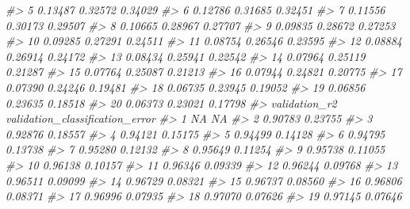 \documentclass[]{book}
\newenvironment{Shaded}{\begin{snugshade}}{\end{snugshade}}
\newcommand{\CommentTok}[1]{\textcolor[rgb]{0.56,0.35,0.01}{\textit{#1}}}
\begin{document}
\begin{Shaded}
\begin{Highlighting}[]
{{{{\CommentTok{#> 5                        0.13487         0.32572            0.34029}
\CommentTok{#> 6                        0.12786         0.31685            0.32451}
\CommentTok{#> 7                        0.11556         0.30173            0.29507}
\CommentTok{#> 8                        0.10665         0.28967            0.27707}
\CommentTok{#> 9                        0.09835         0.28672            0.27253}
\CommentTok{#> 10                       0.09285         0.27291            0.24511}
\CommentTok{#> 11                       0.08754         0.26546            0.23595}
\CommentTok{#> 12                       0.08884         0.26914            0.24172}
\CommentTok{#> 13                       0.08434         0.25941            0.22542}
\CommentTok{#> 14                       0.07964         0.25119            0.21287}
\CommentTok{#> 15                       0.07764         0.25087            0.21213}
\CommentTok{#> 16                       0.07944         0.24821            0.20775}
\CommentTok{#> 17                       0.07390         0.24246            0.19481}
\CommentTok{#> 18                       0.06735         0.23945            0.19052}
\CommentTok{#> 19                       0.06856         0.23635            0.18518}
\CommentTok{#> 20                       0.06373         0.23021            0.17798}
\CommentTok{#>    validation_r2 validation_classification_error}
\CommentTok{#> 1             NA                              NA}
\CommentTok{#> 2        0.90783                         0.23755}
\CommentTok{#> 3        0.92876                         0.18557}
\CommentTok{#> 4        0.94121                         0.15175}
\CommentTok{#> 5        0.94499                         0.14128}
\CommentTok{#> 6        0.94795                         0.13738}
\CommentTok{#> 7        0.95280                         0.12132}
\CommentTok{#> 8        0.95649                         0.11254}
\CommentTok{#> 9        0.95738                         0.11055}
\CommentTok{#> 10       0.96138                         0.10157}
\CommentTok{#> 11       0.96346                         0.09339}
\CommentTok{#> 12       0.96244                         0.09768}
\CommentTok{#> 13       0.96511                         0.09099}
\CommentTok{#> 14       0.96729                         0.08321}
\CommentTok{#> 15       0.96737                         0.08560}
\CommentTok{#> 16       0.96806                         0.08371}
\CommentTok{#> 17       0.96996                         0.07935}
\CommentTok{#> 18       0.97070                         0.07626}
\CommentTok{#> 19       0.97145                         0.07646}
}}}}
\end{Highlighting}
\end{Shaded}
\end{document}
